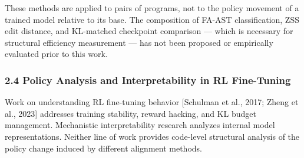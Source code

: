 These methods are applied to pairs of programs, not to the policy movement of a trained model relative to its base. The composition of FA-AST classification, ZSS edit distance, and KL-matched checkpoint comparison — which is necessary for structural efficiency measurement — has not been proposed or empirically evaluated prior to this work.

\subsubsection{2.4 Policy Analysis and Interpretability in RL Fine-Tuning}

Work on understanding RL fine-tuning behavior [Schulman et al., 2017; Zheng et al., 2023] addresses training stability, reward hacking, and KL budget management. Mechanistic interpretability research \citep{Elhageetal2022} analyzes internal model representations. Neither line of work provides code-level structural analysis of the policy change induced by different alignment methods.
